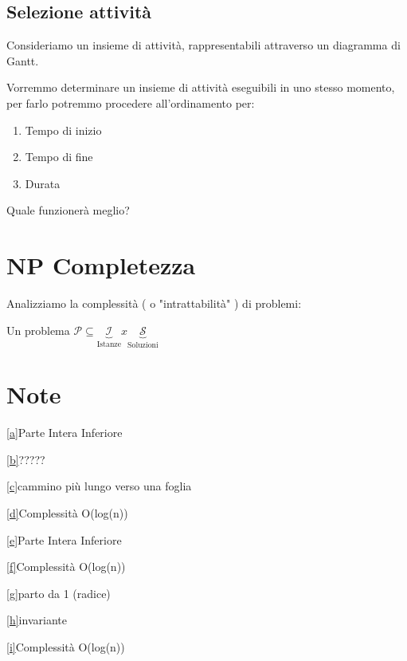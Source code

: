 \documentclass[tikz]{article}
\begin{document}
{{\subsection{Selezione attività}

Consideriamo un insieme di attività, rappresentabili attraverso un diagramma di Gantt.



Vorremmo determinare un insieme di attività eseguibili in uno stesso momento, per farlo potremmo procedere all'ordinamento per:

\begin{enumerate}
\item Tempo di inizio
\item Tempo di fine
\item Durata
\end{enumerate}

Quale funzionerà meglio?

\section{NP Completezza}

Analizziamo la complessità ( o  "intrattabilità" ) di problemi:

Un problema $\mathcal{P} \subseteq \underbrace{\mathcal{I} }_\text{Istanze} x  \underbrace{\mathcal{S} }_\text{Soluzioni}$ 

\section{Note}

\protect\hyperlink{cmnt_ref1}{{[}a{]}}{Parte Intera Inferiore}

\protect\hyperlink{cmnt_ref2}{{[}b{]}}{?????}

\protect\hyperlink{cmnt_ref3}{{[}c{]}}{cammino più lungo verso una
foglia}

\protect\hyperlink{cmnt_ref4}{{[}d{]}}{Complessità O(log(n))}

\protect\hyperlink{cmnt_ref5}{{[}e{]}}{Parte Intera Inferiore}

\protect\hyperlink{cmnt_ref6}{{[}f{]}}{Complessità O(log(n))}

\protect\hyperlink{cmnt_ref7}{{[}g{]}}{parto da 1 (radice)}

\protect\hyperlink{cmnt_ref8}{{[}h{]}}{invariante}

\protect\hyperlink{cmnt_ref9}{{[}i{]}}{Complessità O(log(n))}

}}
\end{document}
